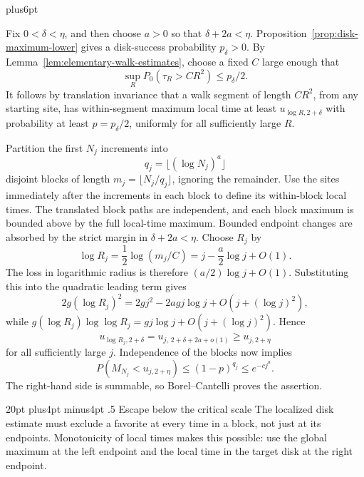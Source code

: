 \documentclass[12pt,reqno]{amsart}
\makeatletter
\def\section{\@startsection{section}{1}{0pt}%
  {20pt plus4pt minus4pt}
  {.5\linespacing}
  {\normalfont\bfseries}}
\theoremstyle{plain}
\theoremstyle{definition}
\theoremstyle{remark}
\renewenvironment{proof}[1][\proofname]{%
  \par
  \pushQED{\qed}%
  \normalfont
  \topsep6pt plus6pt\relax
  \trivlist
  \item[\hskip\labelsep\slshape #1\@addpunct{.}]%
  \ignorespaces
}{%
  \popQED
  \endtrivlist
  \@endpefalse
}
\DeclareRobustCommand{\qed}{%
  \leavevmode\unskip\penalty9999\hbox{}\nobreak
  \ifmmode
    \makebox[0pt][l]{\qquad\hbox{\qedsymbol}}%
  \else
    \qquad\hbox{\qedsymbol}%
  \fi
}
\renewcommand{\qedsymbol}{\rule[.47pt]{4pt}{6pt}}
\numberwithin{equation}{section}
\makeatother
\begin{document}
\begin{proof}
Fix $0<\delta<\eta$, and then choose $a>0$ so that
$\delta+2a<\eta$.  Proposition~\ref{prop:disk-maximum-lower}
gives a disk-success probability $p_\delta>0$.  By
Lemma~\ref{lem:elementary-walk-estimates}, choose a fixed $C$
large enough that
\[
 \sup_R P_0(\tau_R>CR^2)\le p_\delta/2.
\]
It follows by translation invariance that a walk segment of length
$CR^2$, from any starting site, has within-segment maximum local
time at least $u_{\log R,2+\delta}$ with probability at least
$p=p_\delta/2$, uniformly for all sufficiently large $R$.

Partition the first $N_j$ increments into
\[
 q_j=\lfloor(\log N_j)^a\rfloor
\]
disjoint blocks of length $m_j=\lfloor N_j/q_j\rfloor$, ignoring
the remainder.  Use the sites immediately after the increments in
each block to define its within-block local times.  The translated
block paths are independent, and each block maximum is bounded
above by the full local-time maximum.  Bounded endpoint changes
are absorbed by the strict margin in $\delta+2a<\eta$.
Choose $R_j$ by
\[
 \log R_j=\frac12\log(m_j/C)
         =j-\frac a2\log j+O(1).
\]
The loss in logarithmic radius is therefore $(a/2)\log j+O(1)$.
Substituting this into the quadratic leading term gives
\[
 2g(\log R_j)^2
 =2gj^2-2agj\log j+O(j+(\log j)^2),
\]
while
$g(\log R_j)\log\log R_j=gj\log j+O(j+(\log j)^2)$.
Hence
\begin{equation}
 u_{\log R_j,2+\delta}
 =u_{j,\,2+\delta+2a+o(1)}
 \ge u_{j,2+\eta}
 \label{eq:deterministic-block-level}
\end{equation}
for all sufficiently large $j$.  Independence of the blocks now
implies
\begin{equation}
 P(M_{N_j}<u_{j,2+\eta})
 \le(1-p)^{q_j}\le e^{-cj^a}.
 \label{eq:deterministic-failure-summable}
\end{equation}
The right-hand side is summable, so Borel--Cantelli proves the
assertion.
\end{proof}


\section{Escape below the critical scale}\label{sec:escape}
The localized disk estimate must exclude a favorite at every time in a block,
not just at its endpoints. Monotonicity of local times makes this possible:
use the global maximum at the left endpoint and the local time in the target
disk at the right endpoint.
\end{document}
